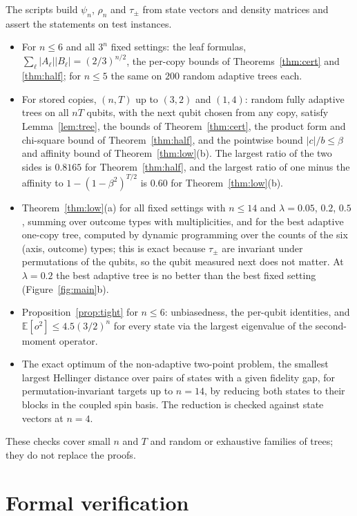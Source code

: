 \documentclass[11pt]{article}
\theoremstyle{remark}
\newcommand{\E}{\mathbb{E}}
\begin{document}
The scripts build $\psi_n$, $\rho_n$ and $\tau_\pm$ from state vectors and density matrices and assert the statements on test instances.
\begin{itemize}
\item For $n\le6$ and all $3^n$ fixed settings: the leaf formulas, $\sum_\ell|A_\ell||B_\ell| = (2/3)^{n/2}$, the per-copy bounds of Theorems~\ref{thm:cert} and \ref{thm:half}; for $n\le5$ the same on $200$ random adaptive trees each.
\item For stored copies, $(n,T)$ up to $(3,2)$ and $(1,4)$: random fully adaptive trees on all $nT$ qubits, with the next qubit chosen from any copy, satisfy Lemma~\ref{lem:tree}, the bounds of Theorem~\ref{thm:cert}, the product form and chi-square bound of Theorem~\ref{thm:half}, and the pointwise bound $|c|/b\le\beta$ and affinity bound of Theorem~\ref{thm:low}(b). The largest ratio of the two sides is $0.8165$ for Theorem~\ref{thm:half}, and the largest ratio of one minus the affinity to $1-(1-\beta^2)^{T/2}$ is $0.60$ for Theorem~\ref{thm:low}(b).
\item Theorem~\ref{thm:low}(a) for all fixed settings with $n\le14$ and $\lambda = 0.05$, $0.2$, $0.5$, summing over outcome types with multiplicities, and for the best adaptive one-copy tree, computed by dynamic programming over the counts of the six (axis, outcome) types; this is exact because $\tau_\pm$ are invariant under permutations of the qubits, so the qubit measured next does not matter. At $\lambda = 0.2$ the best adaptive tree is no better than the best fixed setting (Figure~\ref{fig:main}b).
\item Proposition~\ref{prop:tight} for $n\le6$: unbiasedness, the per-qubit identities, and $\E[o^2]\le4.5(3/2)^n$ for every state via the largest eigenvalue of the second-moment operator.
\item The exact optimum of the non-adaptive two-point problem, the smallest largest Hellinger distance over pairs of states with a given fidelity gap, for permutation-invariant targets up to $n = 14$, by reducing both states to their blocks in the coupled spin basis. The reduction is checked against state vectors at $n = 4$.
\end{itemize}
These checks cover small $n$ and $T$ and random or exhaustive families of trees; they do not replace the proofs.

\section{Formal verification}\label{sec:lean}
\end{document}
